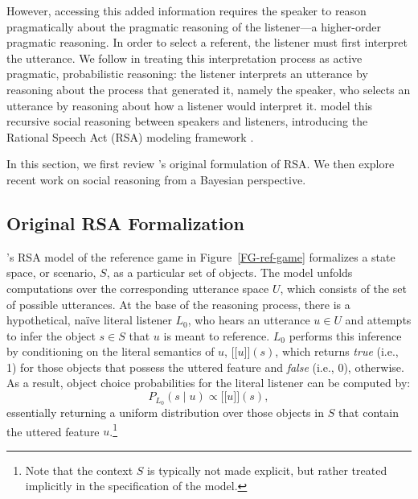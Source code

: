 \documentclass[11pt,a4paper]{article}
\newcommand{\sem}[1]{\mbox{$[\![$#1$]\!]$}}
\begin{document}
However, accessing this added information requires the speaker to reason pragmatically about the pragmatic reasoning of the listener---a higher-order pragmatic reasoning.
In order to select a referent, the listener must first interpret the utterance. We follow  in treating this interpretation process as active pragmatic, probabilistic reasoning: the listener interprets an utterance by reasoning about the process that generated it, namely the speaker, who selects an utterance by reasoning about how a listener would interpret it. \citeauthor{frankgoodman2012} model this recursive social reasoning between speakers and listeners, introducing the Rational Speech Act (RSA) modeling framework \cite{frankgoodman2012,frankejaeger2016,goodmanfrank2016}.

In this section, we first review  \citeauthor{frankgoodman2012}'s original formulation of RSA. We then explore recent work on social reasoning from a Bayesian perspective.

\subsection{Original RSA Formalization} \label{rsa}

\citeauthor{frankgoodman2012}'s RSA model of the reference game in Figure~\ref{FG-ref-game} formalizes a state space, or scenario, $S$, as a particular set of objects. %
The model unfolds computations over the corresponding utterance space $U$, which consists of the set of possible utterances. %
At the base of the reasoning process, there is a hypothetical, na\"ive literal listener $L_0$, who hears an utterance $u\in U$ and attempts to infer the object $s \in S$ that $u$ is meant to reference. 
$L_0$ performs this inference by conditioning on the literal semantics of $u$, \sem{$u$}$(s)$, which returns \emph{true} (i.e., 1) for those objects that possess the uttered feature and \emph{false} (i.e., 0), otherwise.
As a result, object choice probabilities for the literal listener can be computed by: 
\begin{equation}
P_{L_{0}}(s\mid u) \propto \sem{$u$}(s),
\end{equation}
essentially returning a uniform distribution over those objects in $S$ that contain the uttered feature $u$.\footnote{Note that the context $S$ is typically not made explicit, but rather treated implicitly in the specification of the model.}
\end{document}
